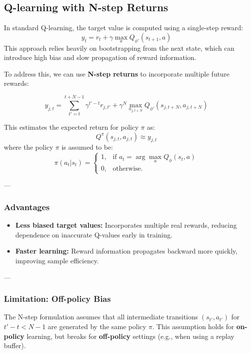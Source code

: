 \documentclass[12pt]{article}
\theoremstyle{definition} %
\theoremstyle{plain} %
\theoremstyle{remark} %
\begin{document}
\begin{CJK}{UTF8}{gbsn}
\subsection{Q-learning with N-step Returns}

In standard Q-learning, the target value is computed using a single-step reward:
\[
y_t = r_t + \gamma \max_a Q_{\phi'}(s_{t+1}, a)
\]
This approach relies heavily on bootstrapping from the next state, which can introduce high bias and slow propagation of reward information.

To address this, we can use \textbf{N-step returns} to incorporate multiple future rewards:

\[
y_{j,t} = 
\sum_{t' = t}^{t + N - 1} 
\gamma^{t' - t} r_{j,t'} 
+ 
\gamma^N \max_{a_{j,t+N}} 
Q_{\phi'}(s_{j,t+N}, a_{j,t+N})
\]

This estimates the expected return for policy $\pi$ as:
\[
Q^\pi(s_{j,t}, a_{j,t}) \approx y_{j,t}
\]
where the policy $\pi$ is assumed to be:
\[
\pi(a_t|s_t) =
\begin{cases}
1, & \text{if } a_t = \arg\max_a Q_\phi(s_t, a) \\
0, & \text{otherwise.}
\end{cases}
\]

---

\subsubsection*{Advantages}

\begin{itemize}
    \item \textbf{Less biased target values:} Incorporates multiple real rewards, reducing dependence on inaccurate Q-values early in training.
    \item \textbf{Faster learning:} Reward information propagates backward more quickly, improving sample efficiency.
\end{itemize}

---

\subsubsection*{Limitation: Off-policy Bias}

The N-step formulation assumes that all intermediate transitions 
$(s_{t'}, a_{t'})$ for $t' - t < N-1$ 
are generated by the same policy $\pi$.  
This assumption holds for \textbf{on-policy} learning, but breaks for \textbf{off-policy} settings (e.g., when using a replay buffer).


\end{CJK}
\end{document}

